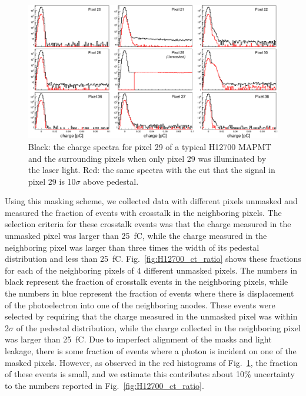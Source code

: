 \begin{figure}[h!bt] 
    \centering 
    \includegraphics[width=.9\textwidth,height=0.5\textwidth]{figures/H12700_3mm_mask_config5_ct_updated.png}
    \caption{Black: the charge spectra for pixel 29 of a typical H12700 MAPMT and the surrounding pixels when only pixel 29 was illuminated by the laser light. Red: the same spectra with the cut that the signal in pixel 29 is 10$\sigma$ above pedestal.}
    \label{fig:H12700pinhole}
\end{figure}

Using this masking scheme, we collected data with different pixels unmasked and measured the fraction of events with crosstalk in the neighboring pixels. The selection criteria for these crosstalk events was that the charge measured in the unmasked pixel was larger than 25~fC, while the charge measured in the neighboring pixel was larger than three times the width of it\textquotesingle s pedestal distribution and less than 25~fC. Fig.~\ref{fig:H12700_ct_ratio} shows these fractions for each of the neighboring pixels of 4 different unmasked pixels. The numbers in black represent the fraction of crosstalk events in the neighboring pixels, while the numbers in blue represent the fraction of events where there is displacement of the photoelectron into one of the neighboring anodes. These events were selected by requiring that the charge measured in the unmasked pixel was within 2$\sigma$ of the pedestal distribution, while the charge collected in the neighboring pixel was larger than 25~fC. Due to imperfect alignment of the masks and light leakage, there is some fraction of events where a photon is incident on one of the masked pixels. However, as observed in the red histograms of Fig.~\ref{fig:H12700pinhole}, the fraction of these events is small, and we estimate this contributes about 10$\%$ uncertainty to the numbers reported in Fig.~\ref{fig:H12700_ct_ratio}.

